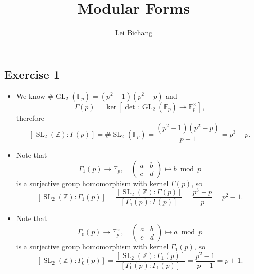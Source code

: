 \documentclass{article}
\title{Modular Forms}
\author{Lei Bichang}
\date{}
\theoremstyle{definition}
\theoremstyle{remark}
\newcommand{\Z}{\mathbb{Z}}
\DeclareMathOperator{\GL}{GL}
\DeclareMathOperator{\SL}{SL}
\newcommand{\F}{\mathbb{F}}
\begin{document}
\maketitle


\subsection*{Exercise 1}
\begin{itemize}
    \item We know $\#\GL_2(\F_p) = (p^2-1)(p^2-p)$  and \[\Gamma(p) = \ker \left[ \det : \GL_2(\F_p)\twoheadrightarrow\F_p^\times \right],\]
    therefore\[[\SL_2(\Z) : \Gamma(p)] = \#\SL_2(\F_p) = \frac{(p^2-1)(p^2-p)}{p-1} = p^3-p.\]
    
    \item Note that \[\Gamma_1(p)\to \F_p,\quad \begin{pmatrix}
        a & b \\ c & d
    \end{pmatrix}\mapsto b\bmod p\] is a surjective group homomorphism with kernel $\Gamma(p)$, so \[[\SL_2(\Z) : \Gamma_1(p)] = \frac{[\SL_2(\Z) : \Gamma(p)]}{[\Gamma_1(p) : \Gamma(p)]} = \frac{p^3-p}{p} = p^2-1.\]

    \item Note that \[\Gamma_0(p)\to\F_p^\times,\quad 
    \begin{pmatrix}
        a & b \\ c & d
    \end{pmatrix}\mapsto a\bmod p\] is a surjective group homomorphism with kernel $\Gamma_1(p)$,
    so \[[\SL_2(\Z) : \Gamma_0(p)] = \frac{[\SL_2(\Z) : \Gamma_1(p)]}{[\Gamma_0(p) : \Gamma_1(p)]} = \frac{p^2-1}{p-1} = p + 1.\]
\end{itemize}
\end{document}
